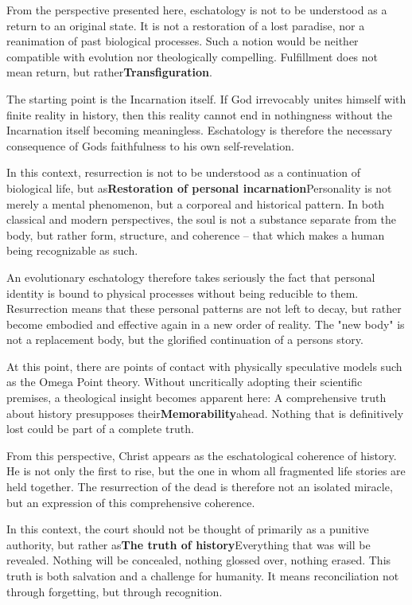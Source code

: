 \documentclass[
]{article}
\begin{document}
From the perspective presented here, eschatology is not to be understood as a return to an original state. It is not a restoration of a lost paradise, nor a reanimation of past biological processes. Such a notion would be neither compatible with evolution nor theologically compelling. Fulfillment does not mean return, but rather\textbf{Transfiguration}.

The starting point is the Incarnation itself. If God irrevocably unites himself with finite reality in history, then this reality cannot end in nothingness without the Incarnation itself becoming meaningless. Eschatology is therefore the necessary consequence of God\textquotesingle s faithfulness to his own self-revelation.

In this context, resurrection is not to be understood as a continuation of biological life, but as\textbf{Restoration of personal incarnation}Personality is not merely a mental phenomenon, but a corporeal and historical pattern. In both classical and modern perspectives, the soul is not a substance separate from the body, but rather form, structure, and coherence -- that which makes a human being recognizable as such.

An evolutionary eschatology therefore takes seriously the fact that personal identity is bound to physical processes without being reducible to them. Resurrection means that these personal patterns are not left to decay, but rather become embodied and effective again in a new order of reality. The "new body" is not a replacement body, but the glorified continuation of a person\textquotesingle s story.

At this point, there are points of contact with physically speculative models such as the Omega Point theory. Without uncritically adopting their scientific premises, a theological insight becomes apparent here: A comprehensive truth about history presupposes their\textbf{Memorability}ahead. Nothing that is definitively lost could be part of a complete truth.

From this perspective, Christ appears as the eschatological coherence of history. He is not only the first to rise, but the one in whom all fragmented life stories are held together. The resurrection of the dead is therefore not an isolated miracle, but an expression of this comprehensive coherence.

In this context, the court should not be thought of primarily as a punitive authority, but rather as\textbf{The truth of history}Everything that was will be revealed. Nothing will be concealed, nothing glossed over, nothing erased. This truth is both salvation and a challenge for humanity. It means reconciliation not through forgetting, but through recognition.
\end{document}
